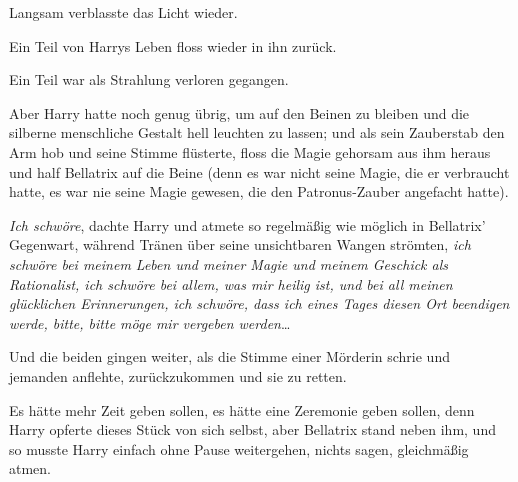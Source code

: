 Langsam verblasste das Licht wieder.

Ein Teil von Harrys Leben floss wieder in ihn zurück.

Ein Teil war als Strahlung verloren gegangen.

Aber Harry hatte noch genug übrig, um auf den Beinen zu bleiben und die silberne menschliche Gestalt hell leuchten zu lassen; und als sein Zauberstab den Arm hob und seine Stimme  flüsterte, floss die Magie gehorsam aus ihm heraus und half Bellatrix auf die Beine (denn es war nicht seine Magie, die er verbraucht hatte, es war nie seine Magie gewesen, die den Patronus-Zauber angefacht hatte).

\emph{Ich schwöre}, dachte Harry und atmete so regelmäßig wie möglich in Bellatrix' Gegenwart, während Tränen über seine unsichtbaren Wangen strömten, \emph{ich schwöre bei meinem Leben und meiner Magie und meinem Geschick als Rationalist, ich schwöre bei allem, was mir heilig ist, und bei all meinen glücklichen Erinnerungen, ich schwöre, dass ich eines Tages diesen Ort beendigen werde, bitte, bitte möge mir vergeben werden}…

Und die beiden gingen weiter, als die Stimme einer Mörderin schrie und jemanden anflehte, zurückzukommen und sie zu retten.

Es hätte mehr Zeit geben sollen, es hätte eine Zeremonie geben sollen, denn Harry opferte dieses Stück von sich selbst, aber Bellatrix stand neben ihm, und so musste Harry einfach ohne Pause weitergehen, nichts sagen, gleichmäßig atmen.


